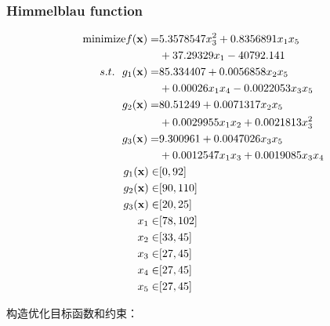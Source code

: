 \documentclass[]{ctexbook}
\theoremstyle{definition}
\theoremstyle{definition}
\theoremstyle{definition}
\theoremstyle{remark}
\begin{document}
\subsubsection{Himmelblau function}\label{BSAShim}

\begin{align}
\text{minimize} f(\mathbf{x}) =& 5.3578547x^2_3 +0.8356891x_1x_5\notag \\
&+ 37.29329x_1 - 40792.141 \notag\\
s.t. ~~g_1(\mathbf{x}) =& 85.334407 + 0.0056858x_2x_5\notag\\
&+ 0.00026x_1x_4 - 0.0022053x_3x_5  \notag\\
g_2(\mathbf{x}) =&80.51249 +0.0071317x_2x_5\notag\\
&+ 0.0029955x_1x_2 + 0.0021813x^2_3  \notag\\
g_3(\mathbf{x}) =& 9.300961 +0.0047026x_3x_5\notag\\
&+ 0.0012547x_1x_3 + 0.0019085x_3x_4 \notag\\
g_1(\mathbf{x})\in&[0,92] \notag\\
g_2(\mathbf{x})\in&[90,110] \notag\\
g_3(\mathbf{x})\in&[20,25] \notag\\
x_1\in&[78,102] \notag\\
x_2\in&[33,45] \notag\\
x_3\in&[27,45] \notag\\
x_4\in&[27,45] \notag\\
x_5\in&[27,45] \notag\\
\label{eq:him}
\end{align}

构造优化目标函数和约束：
\end{document}
